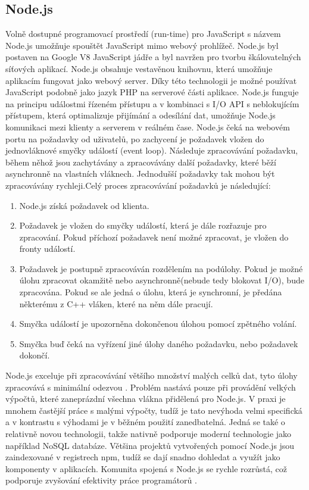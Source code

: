         \subsection{Node.js}
Volně dostupné programovací prostředí (run-time) pro JavaScript s názvem Node.js umožňuje spouštět JavaScript mimo webový prohlížeč. Node.js byl postaven na Google V8 JavaScript jádře a byl navržen pro tvorbu škálovatelných síťových aplikací. Node.js obsahuje vestavěnou knihovnu, která umožňuje aplikacím fungovat jako webový server. Díky této technologii je možné používat JavaScript podobně jako jazyk PHP na serverové části aplikace. Node.js funguje na principu událostmi řízeném přístupu a v kombinaci s I/O API s neblokujícím přístupem, která optimalizuje přijímání a odesílání dat, umožňuje Node.js komunikaci mezi klienty a serverem v reálném čase. Node.js čeká na webovém portu na požadavky od uživatelů, po zachycení je požadavek vložen do jednovláknové smyčky událostí (event loop). Následuje zpracovávání požadavku, během něhož jsou zachytávány a zpracovávány další požadavky, které běží asynchronně na vlastních vláknech. Jednodušší požadavky tak mohou být zpracovávány rychleji.Celý proces zpracovávání požadavků je následující:
\begin{enumerate}
  \item Node.js získá požadavek od klienta.
  \item Požadavek je vložen do smyčky událostí, která je dále rozřazuje pro zpracování. Pokud příchozí požadavek není možné zpracovat, je vložen do fronty událostí.
  \item Požadavek je postupně zpracováván rozdělením na podúlohy. Pokud je možné úlohu zpracovat okamžitě nebo asynchronně(nebude tedy blokovat I/O), bude zpracována. Pokud se ale jedná o úlohu, která je synchronní, je předána některému z C++ vláken, které na něm dále pracují.
  \item Smyčka událostí je upozorněna dokončenou úlohou pomocí zpětného volání.
  \item Smyčka buď čeká na vyřízení jiné úlohy daného požadavku, nebo požadavek dokončí.
\end{enumerate}
Node.js exceluje při zpracovávání většího množství malých celků dat, tyto úlohy zpracovává s minimální odezvou \cite{nodejsevent}. Problém nastává pouze při provádění velkých výpočtů, které zaneprázdní všechna vlákna přidělená pro Node.js. V praxi je mnohem častější práce s malými výpočty, tudíž je tato nevýhoda velmi specifická a v kontrastu s výhodami je v běžném použití zanedbatelná. Jedná se také o relativně novou technologii, takže nativně podporuje moderní technologie jako například NoSQL databáze. Většina projektů vytvořených pomocí Node.js jsou zaindexované v registrech npm, tudíž se dají snadno dohledat a využít jako komponenty v aplikacích. Komunita spojená s Node.js se rychle rozrůstá, což podporuje zvyšování efektivity práce programátorů \cite{nodejsdevelopment}.

